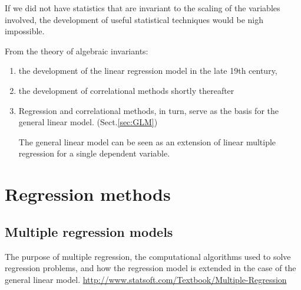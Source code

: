If we did not have statistics that are invariant to the scaling of the variables
involved, the development of useful statistical techniques would be nigh
impossible.

From the theory of algebraic invariants:
\begin{enumerate}
  \item  the development of the linear regression model in the late 19th
  century,
  
  \item the development of correlational methods shortly thereafter
  
  \item Regression and correlational methods, in turn, serve as the basis for
  the general linear model. (Sect.\ref{sec:GLM})

The general linear model can be seen as an extension of linear multiple
regression for a single dependent variable.
\end{enumerate}






\chapter{Regression methods}

\section{Multiple regression models}
\label{sec:multiple-regression-model}

The purpose of multiple regression, the computational algorithms used to solve
regression problems, and how the regression model is extended in the case of the
general linear model.
\url{http://www.statsoft.com/Textbook/Multiple-Regression}






